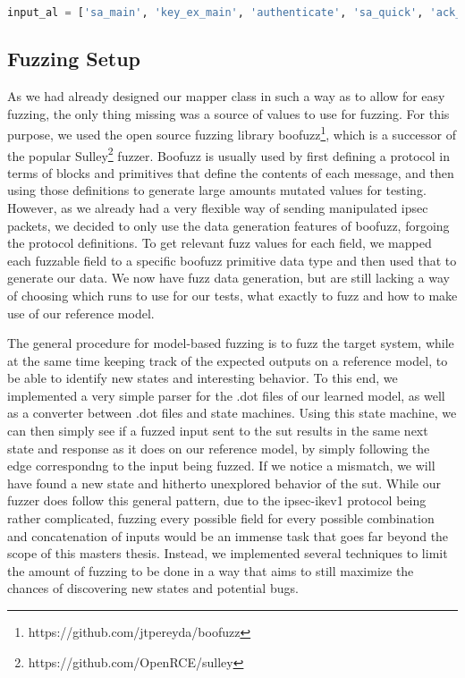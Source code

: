 \begin{lstlisting}[float=h, caption=The Updated Input Alphabet, label=lst:inputal_2, numbers=none, language=python]
	input_al = ['sa_main', 'key_ex_main', 'authenticate', 'sa_quick', 'ack_quick', 'sa_main_err', 'key_ex_main_err', 'authenticate_err', 'sa_quick_err', 'ack_quick_err']
\end{lstlisting}


\subsection{Fuzzing Setup} \label{subsec:fuzz_setup}
As we had already designed our mapper class in such a way as to allow for easy fuzzing, the only thing missing was a source of values to use for fuzzing. For this purpose, we used the open source fuzzing library boofuzz\footnote{https://github.com/jtpereyda/boofuzz}, which is a successor of the popular Sulley\footnote{https://github.com/OpenRCE/sulley} fuzzer. Boofuzz is usually used by first defining a protocol in terms of blocks and primitives that define the contents of each message, and then using those definitions to generate large amounts mutated values for testing. However, as we already had a very flexible way of sending manipulated \ac{ipsec} packets, we decided to only use the data generation features of boofuzz, forgoing the protocol definitions. To get relevant fuzz values for each field, we mapped each fuzzable field to a specific boofuzz primitive data type and then used that to generate our data. We now have fuzz data generation, but are still lacking a way of choosing which runs to use for our tests, what exactly to fuzz and how to make use of our reference model.

The general procedure for model-based fuzzing is to fuzz the target system, while at the same time keeping track of the expected outputs on a reference model, to be able to identify new states and interesting behavior. To this end, we implemented a very simple parser for the .dot files of our learned model, as well as a converter between .dot files and state machines. Using this state machine, we can then simply see if a fuzzed input sent to the \ac{sut} results in the same next state and response as it does on our reference model, by simply following the edge correspondng to the input being fuzzed. If we notice a mismatch, we will have found a new state and hitherto unexplored behavior of  the \ac{sut}. While our fuzzer does follow this general pattern, due to the \ac{ipsec}-\ac{ike}v1 protocol being rather complicated, fuzzing every possible field for every possible combination and concatenation of inputs would be an immense task that goes far beyond the scope of this masters thesis. Instead, we implemented several techniques to limit the amount of fuzzing to be done in a way that aims to still maximize the chances of discovering new states and potential bugs. 

